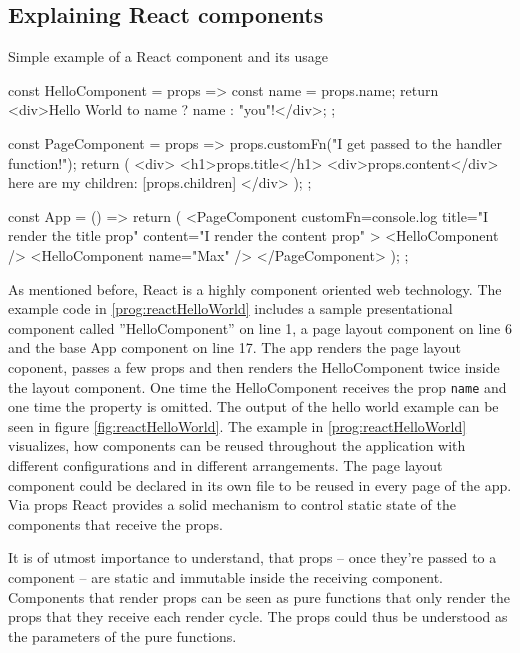 \subsection{Explaining React components}
\label{sec:reactComponents}

\begin{program}
\caption{Simple example of a React component and its usage} 
\label{prog:reactHelloWorld}
\begin{JsCode}
const HelloComponent = props => {
  const name = props.name;
  return <div>Hello World to {name ? name : "you"}!</div>;
};

const PageComponent = props => {
  props.customFn("I get passed to the handler function!");
  return (
    <div>
      <h1>{props.title}</h1>
      <div>{props.content}</div>
      here are my children: [{props.children}]
    </div>
  );
};

const App = () => {
  return (
    <PageComponent
      customFn={console.log}
      title="I render the title prop"
      content="I render the content prop"
    >
      <HelloComponent />
      <HelloComponent name={"Max"} />
    </PageComponent>
  );
};
\end{JsCode}
\end{program}

As mentioned before, React is a highly component oriented web technology. The example code in \ref{prog:reactHelloWorld} includes a sample presentational component called ''HelloComponent'' on line 1, a page layout component on line 6 and the base App component on line 17. The app renders the page layout coponent, passes a few props and then renders the HelloComponent twice inside the layout component. One time the HelloComponent receives the prop \texttt{name} and one time the property is omitted. The output of the hello world example can be seen in figure \ref{fig:reactHelloWorld}. The example in \ref{prog:reactHelloWorld} visualizes, how components can be reused throughout the application with different configurations and in different arrangements. The page layout component could be declared in its own file to be reused in every page of the app. Via props React provides a solid mechanism to control static state of the components that receive the props. 

It is of utmost importance to understand, that props -- once they're passed to a component -- are static and immutable inside the receiving component. Components that render props can be seen as pure functions that only render the props that they receive each render cycle. The props could thus be understood as the parameters of the pure functions.

